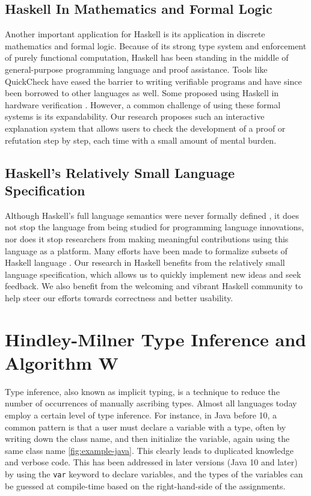 \subsection{Haskell In Mathematics and Formal Logic}

Another important application for Haskell is its application in discrete mathematics and formal logic. Because of its strong type system and enforcement of purely functional computation, Haskell has been standing in the middle of general-purpose programming language and proof assistance. Tools like QuickCheck \cite{Claessen2000-rl} have eased the barrier to writing verifiable programs and have since been borrowed to other languages as well. Some proposed using Haskell in hardware verification \cite{Bjesse1998-lh}. However, a common challenge of using these formal systems is its expandability. Our research proposes such an interactive explanation system that allows users to check the development of a proof or refutation step by step, each time with a small amount of mental burden. 


\subsection{Haskell's Relatively Small Language Specification}

Although Haskell's full language semantics were never formally defined \cite{Hudak2007-kn}, it does not stop the language from being studied for programming language innovations, nor does it stop researchers from making meaningful contributions using this language as a platform. Many efforts have been made to formalize subsets of Haskell language \cite{FaxEn2002-nd}. Our research in Haskell benefits from the relatively small language specification, which allows us to quickly implement new ideas and seek feedback.  We also benefit from the welcoming and vibrant Haskell community to help steer our efforts towards correctness and better usability. 


\section{Hindley-Milner Type Inference and Algorithm W}

Type inference, also known as implicit typing, is a technique to reduce the number of occurrences of manually ascribing types. Almost all languages today employ a certain level of type inference. For instance, in Java before 10, a common pattern is that a user must declare a variable with a type, often by writing down the class name, and then initialize the variable, again using the same class name \ref{fig:example-java}. This clearly leads to duplicated knowledge and verbose code. This has been addressed in later versions (Java 10 and later) by using the \texttt{var} keyword \cite{noauthor_undated-an} to declare variables, and the types of the variables can be guessed at compile-time based on the right-hand-side of the assignments.  

